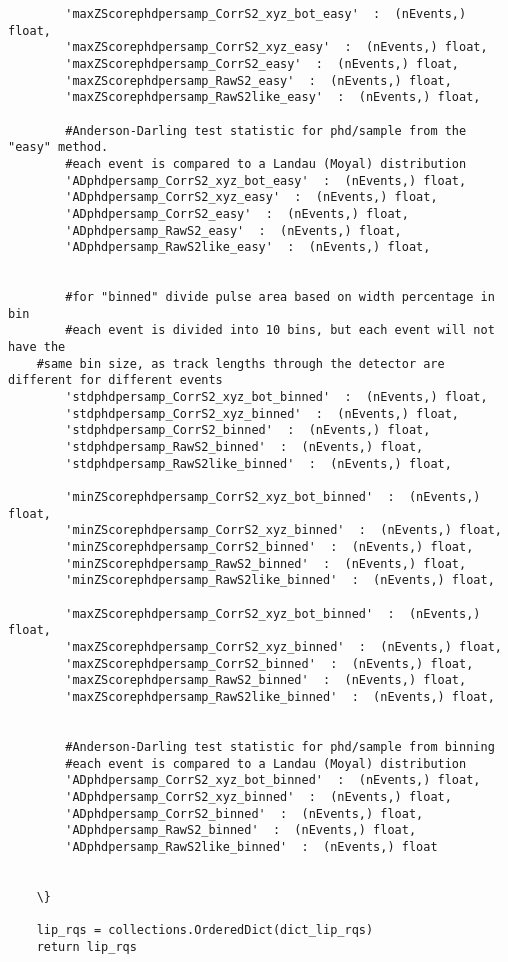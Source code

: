 \begin{verbatim}
        'maxZScorephdpersamp_CorrS2_xyz_bot_easy'  :  (nEvents,) float,
        'maxZScorephdpersamp_CorrS2_xyz_easy'  :  (nEvents,) float,
        'maxZScorephdpersamp_CorrS2_easy'  :  (nEvents,) float,
        'maxZScorephdpersamp_RawS2_easy'  :  (nEvents,) float,
        'maxZScorephdpersamp_RawS2like_easy'  :  (nEvents,) float,

        #Anderson-Darling test statistic for phd/sample from the "easy" method.
        #each event is compared to a Landau (Moyal) distribution
        'ADphdpersamp_CorrS2_xyz_bot_easy'  :  (nEvents,) float,
        'ADphdpersamp_CorrS2_xyz_easy'  :  (nEvents,) float,
        'ADphdpersamp_CorrS2_easy'  :  (nEvents,) float,
        'ADphdpersamp_RawS2_easy'  :  (nEvents,) float,
        'ADphdpersamp_RawS2like_easy'  :  (nEvents,) float,
 

        #for "binned" divide pulse area based on width percentage in bin
    	#each event is divided into 10 bins, but each event will not have the 
	#same bin size, as track lengths through the detector are different for different events
        'stdphdpersamp_CorrS2_xyz_bot_binned'  :  (nEvents,) float,
        'stdphdpersamp_CorrS2_xyz_binned'  :  (nEvents,) float,
        'stdphdpersamp_CorrS2_binned'  :  (nEvents,) float,
        'stdphdpersamp_RawS2_binned'  :  (nEvents,) float,
        'stdphdpersamp_RawS2like_binned'  :  (nEvents,) float,

        'minZScorephdpersamp_CorrS2_xyz_bot_binned'  :  (nEvents,) float,
        'minZScorephdpersamp_CorrS2_xyz_binned'  :  (nEvents,) float,
        'minZScorephdpersamp_CorrS2_binned'  :  (nEvents,) float,
        'minZScorephdpersamp_RawS2_binned'  :  (nEvents,) float,
        'minZScorephdpersamp_RawS2like_binned'  :  (nEvents,) float,

        'maxZScorephdpersamp_CorrS2_xyz_bot_binned'  :  (nEvents,) float,
        'maxZScorephdpersamp_CorrS2_xyz_binned'  :  (nEvents,) float,
        'maxZScorephdpersamp_CorrS2_binned'  :  (nEvents,) float,
        'maxZScorephdpersamp_RawS2_binned'  :  (nEvents,) float,
        'maxZScorephdpersamp_RawS2like_binned'  :  (nEvents,) float,


        #Anderson-Darling test statistic for phd/sample from binning
        #each event is compared to a Landau (Moyal) distribution
        'ADphdpersamp_CorrS2_xyz_bot_binned'  :  (nEvents,) float,
        'ADphdpersamp_CorrS2_xyz_binned'  :  (nEvents,) float,
        'ADphdpersamp_CorrS2_binned'  :  (nEvents,) float,
        'ADphdpersamp_RawS2_binned'  :  (nEvents,) float,
        'ADphdpersamp_RawS2like_binned'  :  (nEvents,) float
        

    \}

    lip_rqs = collections.OrderedDict(dict_lip_rqs)
    return lip_rqs
\end{verbatim}